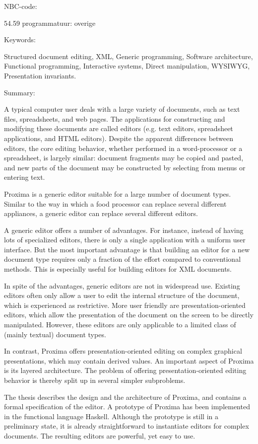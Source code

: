 NBC-code:

54.59 programmatuur: overige


Keywords:

Structured document editing, XML, Generic programming, Software architecture, Functional programming, Interactive systems, Direct manipulation, WYSIWYG, Presentation invariants.


Summary:

A typical computer user deals with a large variety of documents, such as text files, spreadsheets, and web pages. The applications for constructing and modifying these documents are called editors (e.g. text editors, spreadsheet applications, and HTML editors). Despite the apparent differences between editors, the core editing behavior, whether performed in a word-processor or a spreadsheet, is largely similar: document fragments may be copied and pasted, and new parts of the document may be constructed by selecting from menus or entering text. 

Proxima is a generic editor suitable for a large number of document types. Similar to the way in which a food processor can replace several different appliances, a generic editor can replace several different editors.

A generic editor offers a number of advantages. For instance, instead of having lots of specialized editors, there is only a single application with a uniform user interface. But the most important advantage is that building an editor for a new document type requires only a fraction of the effort compared to conventional methods. This is especially useful for building editors for XML documents.

In spite of the advantages, generic editors are not in widespread use. Existing editors often only allow a user to edit the internal structure of the document, which is experienced as restrictive. More user friendly are presentation-oriented editors, which allow the presentation of the document on the screen to be directly manipulated. However, these editors are only applicable to a limited class of (mainly textual) document types.

In contrast, Proxima offers presentation-oriented editing on complex graphical presentations, which may contain derived values. An important aspect of Proxima is its layered architecture. The problem of offering presentation-oriented editing behavior is thereby split up in several simpler subproblems.


The thesis describes the design and the architecture of Proxima, and contains a formal specification of the editor. A prototype of Proxima has been implemented in the functional language Haskell. Although the prototype is still in a preliminary state, it is already straightforward to instantiate editors for complex documents. The resulting editors are powerful, yet easy to use.



